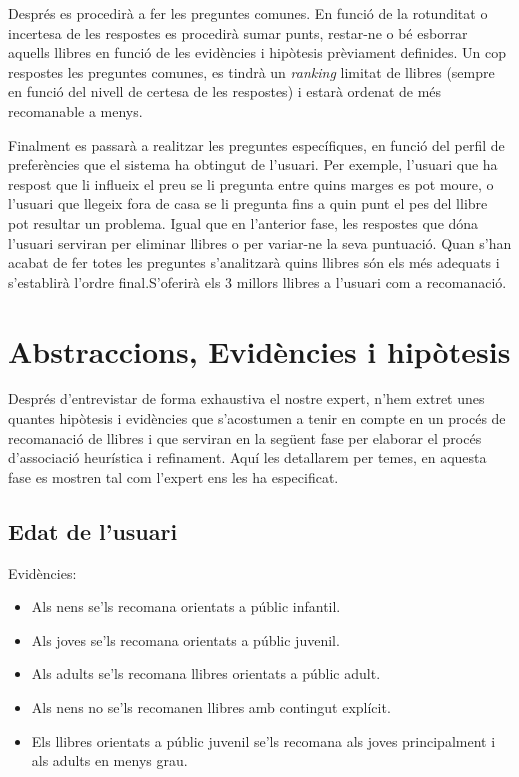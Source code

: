 Després es procedirà a fer les preguntes comunes. En funció de la rotunditat o incertesa de les respostes es procedirà sumar punts, restar-ne o bé esborrar aquells llibres en funció de les evidències i hipòtesis prèviament definides. Un cop respostes les preguntes comunes, es tindrà un \emph{ranking} limitat de llibres (sempre en funció del nivell de certesa de les respostes) i estarà ordenat de més recomanable a menys.

Finalment es passarà a realitzar les preguntes específiques, en funció del perfil de preferències que el sistema ha obtingut de l'usuari. Per exemple, l'usuari que ha respost que li influeix el preu se li pregunta entre quins marges es pot moure, o l'usuari que llegeix fora de casa se li pregunta fins a quin punt el pes del llibre pot resultar un problema. Igual que en l'anterior fase, les respostes que dóna l'usuari serviran per eliminar llibres o per variar-ne la seva puntuació. Quan s'han acabat de fer totes les preguntes s'analitzarà quins llibres són els més adequats i s'establirà l'ordre final.S'oferirà els 3 millors llibres a l'usuari com a recomanació.


\section{Abstraccions, Evidències i hipòtesis}

Després d'entrevistar de forma exhaustiva el nostre expert, n'hem extret unes quantes hipòtesis i evidències que s'acostumen a tenir en compte en un procés de recomanació de llibres i que serviran en la següent fase per elaborar el procés d'associació heurística i refinament. Aquí les detallarem per temes, en aquesta fase es mostren tal com l'expert ens les ha especificat.

\subsection{Edat de l'usuari}
Evidències:
\begin{itemize}
  \item Als nens se'ls recomana orientats a públic infantil.
  \item Als joves se'ls recomana orientats a públic juvenil.  
  \item Als adults se'ls recomana llibres orientats a públic adult.
  \item Als nens no se'ls recomanen llibres amb contingut explícit.
  \item Els llibres orientats a públic juvenil se'ls recomana als joves principalment i als adults en menys grau.
\end{itemize}

